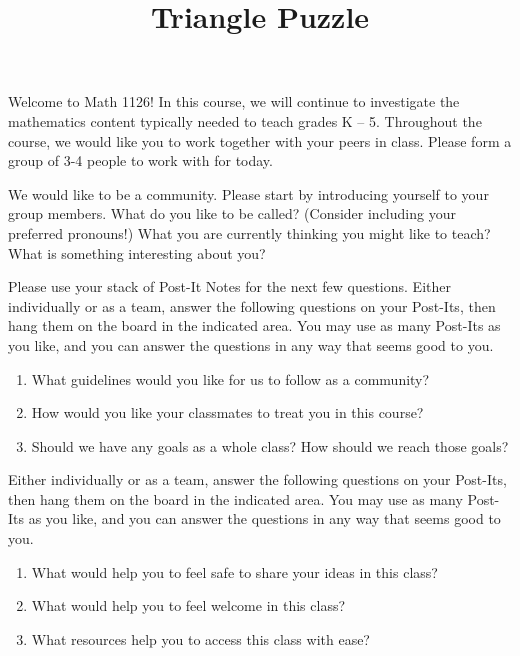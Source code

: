 \documentclass {ximera}
\title{Triangle Puzzle}
\begin{document}
\begin{abstract} 
\end{abstract}
\maketitle

Welcome to Math 1126! In this course, we will continue to investigate the mathematics content typically needed to teach grades K -- 5. Throughout the course, we would like you to work together with your peers in class. Please form a group of 3-4 people to work with for today.

\begin{question}
We would like to be a community. Please start by introducing yourself to your group members. What do you like to be called? (Consider including your preferred pronouns!) What you are currently thinking you might like to teach? What is something interesting about you?
\end{question}


\begin{question}
Please use your stack of Post-It Notes for the next few questions. Either individually or as a team, answer the following questions on your Post-Its, then hang them on the board in the indicated area. You may use as many Post-Its as you like, and you can answer the questions in any way that seems good to you.
\begin{enumerate}
	\item What guidelines would you like for us to follow as a community?
	\item How would you like your classmates to treat you in this course?
	\item Should we have any goals as a whole class? How should we reach those goals?
\end{enumerate}
\end{question}

\begin{question}
Either individually or as a team, answer the following questions on your Post-Its, then hang them on the board in the indicated area. You may use as many Post-Its as you like, and you can answer the questions in any way that seems good to you.
\begin{enumerate}
	\item What would help you to feel safe to share your ideas in this class?
	\item What would help you to feel welcome in this class?
	\item What resources help you to access this class with ease?
\end{enumerate}

\end{question}
\end{document}
